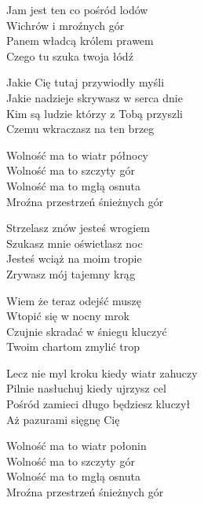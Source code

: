 \begin{text}
    Jam jest ten co pośród lodów\\
    Wichrów i mroźnych gór\\
    Panem władcą królem prawem\\
    Czego tu szuka twoja łódź

    \vin Jakie Cię tutaj przywiodły myśli\\
    \vin Jakie nadzieje skrywasz w serca dnie\\
    \vin Kim są ludzie którzy z Tobą przyszli\\
    \vin Czemu wkraczasz na ten brzeg

    \vin Wolność ma to wiatr północy\\
    \vin Wolność ma to szczyty gór\\
    \vin Wolność ma to mgłą osnuta\\
    \vin Mroźna przestrzeń śnieżnych gór

    Strzelasz znów jesteś wrogiem\\
    Szukasz mnie oświetlasz noc\\
    Jesteś wciąż na moim tropie\\
    Zrywasz mój tajemny krąg

    Wiem że teraz odejść muszę\\
    Wtopić się w nocny mrok\\
    Czujnie skradać w śniegu kluczyć\\
    Twoim chartom zmylić trop

    \vin Lecz nie myl kroku kiedy wiatr zahuczy\\
    \vin Pilnie nasłuchuj kiedy ujrzysz cel\\
    \vin Pośród zamieci długo będziesz kluczył\\
    \vin Aż pazurami sięgnę Cię

    \vin Wolność ma to wiatr połonin\\
    \vin Wolność ma to szczyty gór\\
    \vin Wolność ma to mgłą osnuta\\
    \vin Mroźna przestrzeń śnieżnych gór
\end{text}
\begin{chord}

\end{chord}